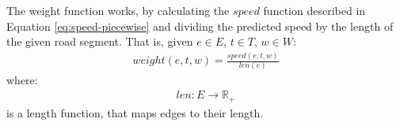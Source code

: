 The weight function works, by calculating the $speed$ function described in Equation \ref{eq:speed-piecewise} and dividing the predicted speed by the length of the given road segment. That is, given $e \in E$, $t \in T$, $w \in W$:
\begin{align}
weight(e,t,w) = \frac{speed(e,t,w)}{len(e)}
\end{align}
where:
\begin{align}
len:E \rightarrow \mathbb{R_+}
\end{align}
is a length function, that maps edges to their length.